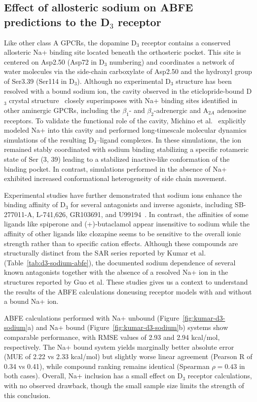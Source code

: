 \subsection{Effect of allosteric sodium on ABFE predictions to the \texorpdfstring{D$_3$}{D3} receptor}
Like other class A GPCRs, the dopamine D$_3$ receptor contains a conserved allosteric Na+ binding site located beneath the orthosteric pocket. This site is centered on Asp2.50 (Asp72 in D$_3$ numbering) and coordinates a network of water molecules via the side-chain carboxylate of Asp2.50 and the hydroxyl group of Ser3.39 (Ser114 in D$_3$). Although no experimental D$_3$ structure has been resolved with a bound sodium ion, the cavity observed in the eticlopride-bound D$_3$ crystal structure~\cite{chien2010structure} closely superimposes with Na+ binding sites identified in other aminergic GPCRs, including the $\beta_1$- and $\beta_2$-adrenergic and A$_{2A}$ adenosine receptors. To validate the functional role of the cavity, Michino et al.~\cite{michino2015structural} explicitly modeled Na+ into this cavity and performed long-timescale molecular dynamics simulations of the resulting D$_3$–ligand complexes. In these simulations, the ion remained stably coordinated with sodium binding stabilizing a specific rotameric state of Ser (3, 39) leading to a stabilized inactive-like conformation of the binding pocket. In contrast, simulations performed in the absence of Na+ exhibited increased conformational heterogeneity of side chain movement.

Experimental studies have further demonstrated that sodium ions enhance the binding affinity of D$_3$ for several antagonists and inverse agonists, including SB-277011-A, L-741,626, GR103691, and U99194~\cite{newton2016examining}. In contrast, the affinities of some ligands like spiperone and (+)-butaclamol appear insensitive to sodium while the affinity of other ligands like clozapine seems to be sensitive to the overall ionic strength rather than to specific cation effects. Although these compounds are structurally distinct from the SAR series reported by Kumar et al.~\cite{kumar2016highly} (Table~\ref{tab:d3-sodium-abfe}), the documented sodium dependence of several known antagonists together with the absence of a resolved Na+ ion in the structures reported by Guo et al. These studies gives us a context to understand the results of the ABFE calculations doneusing receptor models with and without a bound Na+ ion.

ABFE calculations performed with Na+ unbound (Figure~\ref{fig:kumar-d3-sodium}a) and Na+ bound (Figure~\ref{fig:kumar-d3-sodium}b) systems show comparable performance, with RMSE values of 2.93 and 2.94 kcal/mol, respectively. The Na+ bound system yields marginally better absolute error (MUE of 2.22 vs 2.33 kcal/mol) but slightly worse linear agreement (Pearson R of 0.34 vs 0.41), while compound ranking remains identical (Spearman $\rho = 0.43$ in both cases). Overall, Na+ inclusion has a small effect on D$_3$ receptor calculations, with no observed drawback, though the small sample size limits the strength of this conclusion.

